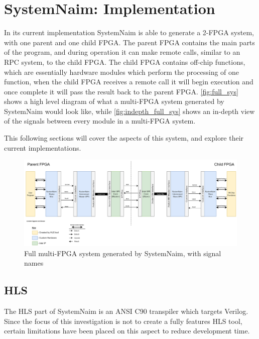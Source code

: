 \chapter{SystemNaim: Implementation}

In its current implementation SystemNaim is able to generate a 2-FPGA system, with one parent and one child FPGA. The parent FPGA contains the main parts of the program, and during operation it can make remote calls, similar to an RPC system, to the child FPGA. The child FPGA contains off-chip functions, which are essentially hardware modules which perform the processing of one function, when the child FPGA receives a remote call it will begin execution and once complete it will pass the result back to the parent FPGA. \autoref{fig:full_sys} shows a high level diagram of what a multi-FPGA system generated by SystemNaim would look like, while \autoref{fig:indepth_full_sys} shows an in-depth view of the signals between every module in a multi-FPGA system.


This following sections will cover the aspects of this system, and explore their current implementations.

\begin{figure}
    \centering
    \includegraphics[width=\textwidth]{04_Implementation/images/FGPA_Interface_block_diagram.png}
    \caption{Full multi-FPGA system generated by SystemNaim, with signal names}
    \label{fig:indepth_full_sys}
\end{figure}


\section{HLS}
\label{sec:hls_impl}

The HLS part of SystemNaim is an ANSI C90 transpiler which targets Verilog. Since the focus of this investigation is not to create a fully features HLS tool, certain limitations have been placed on this aspect to reduce development time.

